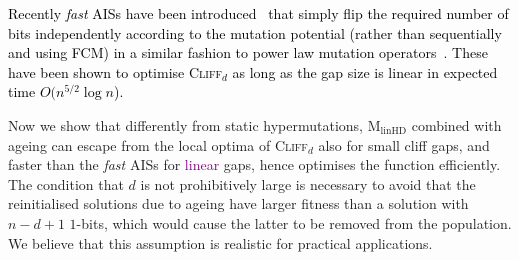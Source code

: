 \documentclass[lettersize,journal]{IEEEtran}
\newcommand{\rerev}[1]{\textcolor{purple}{#1}}
\newcommand{\cliff}{\textsc{Cliff}$_d$}
\newcommand{\linHD}{M$_{\text{linHD}}$}
\begin{document}
\textcolor{black}{Recently {\it fast} AISs have been introduced~\cite{CorusOlivetoYazdani2021TEVC} that simply flip the required number of bits independently according to the mutation potential (rather than sequentially and using FCM) in a similar fashion to power law mutation operators~\cite{DoerrGECCO2017FastGA}. These have been shown to optimise \cliff{} as long as the gap size is linear in expected time $O(n^{5/2} \log n$).
}

Now we show that differently from static hypermutations, {\linHD }
combined with ageing can escape from the local optima of \cliff{} also for small cliff gaps, and faster than the {\it fast} AISs for \rerev{linear} gaps, 
hence optimises the function efficiently. The condition that $d$ is not prohibitively large is necessary to avoid
that the reinitialised solutions due to ageing have larger fitness than a solution with $n-d+1$ $1$-bits, {\color{black} which would cause the latter to be removed from the population}.
We believe that this assumption is realistic for practical applications. 
\end{document}
